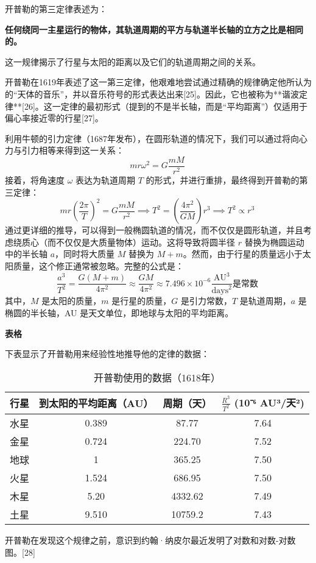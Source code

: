 开普勒的第三定律表述为：

\textbf{任何绕同一主星运行的物体，其轨道周期的平方与轨道半长轴的立方之比是相同的。}

这一规律揭示了行星与太阳的距离以及它们的轨道周期之间的关系。

开普勒在1619年表述了这一第三定律，他艰难地尝试通过精确的规律确定他所认为的“天体的音乐”，并以音乐符号的形式表达出来[25]。因此，它也被称为**谐波定律**[26]。这一定律的最初形式（提到的不是半长轴，而是“平均距离”）仅适用于偏心率接近零的行星[27]。

利用牛顿的引力定律（1687年发布），在圆形轨道的情况下，我们可以通过将向心力与引力相等来得到这一关系：
\[
mr\omega^2 = G\frac{mM}{r^2}~
\]
接着，将角速度 \(\omega\) 表达为轨道周期 \(T\) 的形式，并进行重排，最终得到开普勒的第三定律：
\[
mr\left(\frac{2\pi}{T}\right)^2 = G\frac{mM}{r^2} \implies T^2 = \left(\frac{4\pi^2}{GM}\right)r^3 \implies T^2 \propto r^3~
\]
通过更详细的推导，可以得到一般椭圆轨道的情况，而不仅仅是圆形轨道，并且考虑绕质心（而不仅仅是大质量物体）运动。这将导致将圆半径 \(r\) 替换为椭圆运动中的半长轴 \(a\)，同时将大质量 \(M\) 替换为 \(M+m\)。然而，由于行星的质量远小于太阳质量，这个修正通常被忽略。完整的公式是：
\[
\frac{a^3}{T^2} = \frac{G(M+m)}{4\pi^2} \approx \frac{GM}{4\pi^2} \approx 7.496 \times 10^{-6} \frac{\text{AU}^3}{\text{days}^2} \text{是常数}~
\]
其中，\(M\) 是太阳的质量，\(m\) 是行星的质量，\(G\) 是引力常数，\(T\) 是轨道周期，\(a\) 是椭圆的半长轴，AU 是天文单位，即地球与太阳的平均距离。

\textbf{表格}  

下表显示了开普勒用来经验性地推导他的定律的数据：
\begin{table}[ht]
\centering
\caption{开普勒使用的数据（1618年）}\label{KPL}
\begin{tabular}{|c|c|c|c|}
\hline \textbf{行星} & \textbf{到太阳的平均距离（AU）} & \textbf{周期（天）} & \textbf{\({\frac {R^{3}}{T^{2}}}\) (10⁻⁶ AU³/天²)}\\
\hline 水星	 & 0.389 & 87.77 & 7.64 \\
\hline 金星	 & 0.724 & 224.70 & 7.52 \\
\hline 地球	 & 1 & 365.25 & 7.50 \\
\hline 火星	 & 1.524 & 686.95 & 7.50 \\
\hline 木星	 & 5.20 & 4332.62 & 7.49 \\
\hline 土星	 & 9.510 & 10759.2 & 7.43  \\
\hline 
\end{tabular}
\end{table}
开普勒在发现这个规律之前，意识到约翰·纳皮尔最近发明了对数和对数-对数图。[28]

